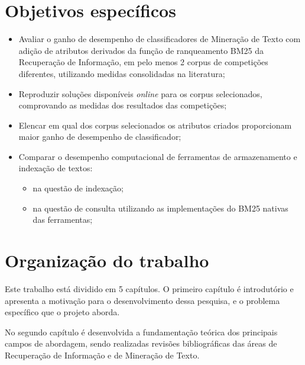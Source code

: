     \section{Objetivos específicos} \label{sec:Objetivos-específicos}
        \begin{itemize}
        	\item Avaliar o ganho de desempenho de classificadores de Mineração de Texto com adição de atributos derivados da função de ranqueamento BM25 da Recuperação de Informação, em pelo menos 2 corpus de competições diferentes, utilizando medidas consolidadas na literatura;
        	
        	\item Reproduzir soluções disponíveis \textit{online} para os corpus selecionados, comprovando as medidas dos resultados das competições;
        	
            \item Elencar em qual dos corpus selecionados os atributos criados proporcionam maior ganho de desempenho de classificador;
            
            \item Comparar o desempenho computacional de ferramentas de armazenamento e indexação de textos:
            \begin{itemize}
                \item na questão de indexação;
                \item na questão de consulta utilizando as implementações do BM25 nativas das ferramentas;
            \end{itemize}
            
        \end{itemize}
    
    \section{Organização do trabalho} \label{sec:Organização-do-trabalho}
        Este trabalho está dividido em 5 capítulos.
        O primeiro capítulo é introdutório e apresenta a motivação para o desenvolvimento dessa pesquisa, e o problema específico que o projeto aborda.
        
        No segundo capítulo é desenvolvida a fundamentação teórica dos principais campos de abordagem, sendo realizadas revisões bibliográficas das áreas de Recuperação de Informação e de Mineração de Texto.
        
